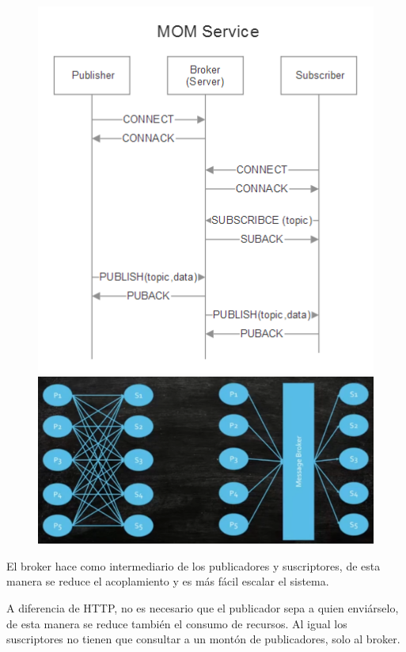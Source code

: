 \documentclass[12pt]{report} %
\begin{document}
\begin{figure}[H]
	{\includegraphics[scale=.5]{2021-04-08 09_17_44-2021-04-07 17-01-12.mkv.png}
	\includegraphics[scale=.22]{2021-04-08 09_20_09-2021-04-07 17-01-12.mkv.png}}
\end{figure}

El broker hace como intermediario de los publicadores y suscriptores, de esta manera se reduce el acoplamiento y es más fácil escalar el sistema. 

A diferencia de HTTP, no es necesario que el publicador sepa a quien enviárselo, de esta manera se reduce también el consumo de recursos. Al igual los suscriptores no tienen que consultar a un montón de publicadores, solo al broker.
\end{document}
